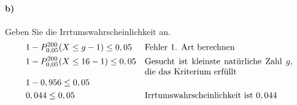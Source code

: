 \documentclass[10pt]{article}
\begin{document}
\begin{example}
\paragraph{b)} Geben Sie die Irrtumswahrscheinlichkeit an.
\begin{align*}
&1 - P^{200}_{0,05}(X \leq g - 1) \leq 0,05 &\parbox[t]{0.5\linewidth}{Fehler 1. Art berechnen} \\
&1 - P^{200}_{0,05}(X \leq 16 - 1) \leq 0,05 &\parbox[t]{0.5\linewidth}{Gesucht ist kleinste natürliche Zahl $g$, die das Kriterium erfüllt} \\
&1 - 0,956 \leq 0,05 &\parbox[t]{0.5\linewidth}{} \\
&0,044 \leq 0,05 &\parbox[t]{0.5\linewidth}{Irrtumswahrscheinlichkeit ist $0,044$} \\
\end{align*}
\end{example}
\end{document}

